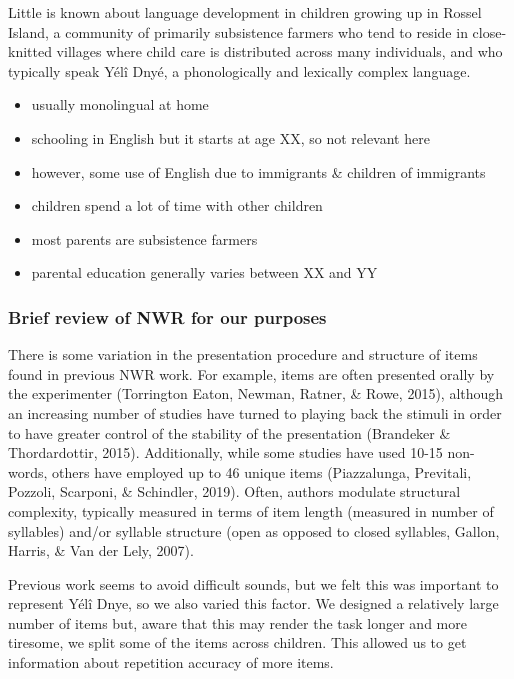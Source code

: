 \documentclass[english,,man]{apa6}
\providecommand{\tightlist}{%
  \setlength{\itemsep}{0pt}\setlength{\parskip}{0pt}}
\begin{document}
Little is known about language development in children growing up in Rossel Island, a community of primarily subsistence farmers who tend to reside in close-knitted villages where child care is distributed across many individuals, and who typically speak Yélî Dnyé, a phonologically and lexically complex language.

\begin{itemize}
\tightlist
\item
  usually monolingual at home
\item
  schooling in English but it starts at age XX, so not relevant here
\item
  however, some use of English due to immigrants \& children of immigrants
\item
  children spend a lot of time with other children
\item
  most parents are subsistence farmers
\item
  parental education generally varies between XX and YY
\end{itemize}

\hypertarget{brief-review-of-nwr-for-our-purposes}{%
\subsubsection{Brief review of NWR for our purposes}\label{brief-review-of-nwr-for-our-purposes}}

There is some variation in the presentation procedure and structure of items found in previous NWR work. For example, items are often presented orally by the experimenter (Torrington Eaton, Newman, Ratner, \& Rowe, 2015), although an increasing number of studies have turned to playing back the stimuli in order to have greater control of the stability of the presentation (Brandeker \& Thordardottir, 2015). Additionally, while some studies have used 10-15 non-words, others have employed up to 46 unique items (Piazzalunga, Previtali, Pozzoli, Scarponi, \& Schindler, 2019). Often, authors modulate structural complexity, typically measured in terms of item length (measured in number of syllables) and/or syllable structure (open as opposed to closed syllables, Gallon, Harris, \& Van der Lely, 2007).

Previous work seems to avoid difficult sounds, but we felt this was important to represent Yélî Dnye, so we also varied this factor. We designed a relatively large number of items but, aware that this may render the task longer and more tiresome, we split some of the items across children. This allowed us to get information about repetition accuracy of more items.
\end{document}
